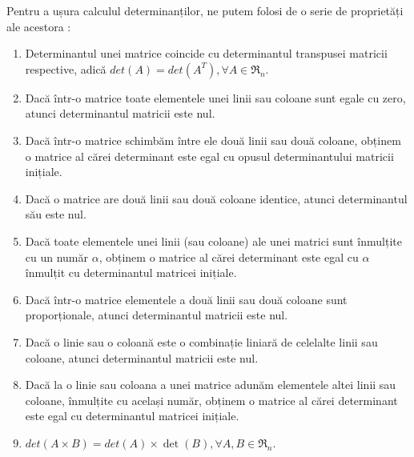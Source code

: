 Pentru a ușura calculul determinanților, ne putem folosi de o serie de
proprietăți ale acestora :
\begin{enumerate}
  \item Determinantul unei matrice coincide cu determinantul transpusei matricii
  respective, adică $det(A) = det(A^{T}), \forall A \in \mathfrak{R}_{n}$.
  \item Dacă într-o matrice toate elementele unei linii sau coloane sunt egale
  cu zero, atunci determinantul matricii este nul.
  \item Dacă într-o matrice schimbăm între ele două linii sau două coloane,
  obținem o matrice al cărei determinant este egal cu opusul determinantului
  matricii inițiale.
  \item Dacă o matrice are două linii sau două coloane identice, atunci
  determinantul său este nul.
  \item Dacă toate elementele unei linii (sau coloane) ale unei matrici sunt
  înmulțite cu un număr $\alpha$, obținem o matrice al cărei determinant este
  egal cu $\alpha$ înmulțit cu determinantul matricei inițiale.
  \item Dacă într-o matrice elementele a două linii sau două coloane sunt
  proporționale, atunci determinantul matricii este nul.
  \item Dacă o linie sau o coloană este o combinație liniară de celelalte linii
  sau coloane, atunci determinantul matricii este nul.
  \item Dacă la o linie sau coloana a unei matrice adunăm elementele altei linii
  sau coloane, înmulțite cu același număr, obținem o matrice al cărei
  determinant este egal cu determinantul matricei inițiale.
  \item $det(A \times B) = det(A) \times \det(B), \forall A, B \in
  \mathfrak{R}_{n}$.
\end{enumerate}
